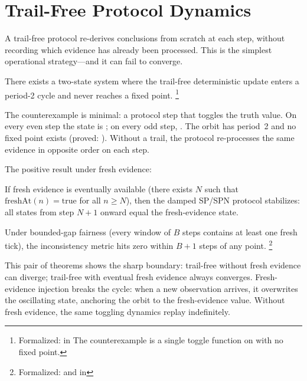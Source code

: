 \documentclass[11pt,openany]{report}
\begin{document}
\section{Trail-Free Protocol Dynamics}
\label{sec:trail-free}

A trail-free protocol re-derives conclusions from scratch at each
step, without recording which evidence has already been processed.
This is the simplest operational strategy---and it can fail to
converge.

\begin{theorem}
\label{thm:trail-free-no-go}
There exists a two-state system where the trail-free deterministic
update enters a period-2 cycle and never reaches a fixed point.%
\footnote{Formalized:
in 
  The counterexample is a single toggle function on
 with no fixed point.}
\end{theorem}

\noindent
The counterexample is minimal: a protocol step that toggles the
truth value.  On every even step the state is ; on every
odd step, .  The orbit has period~2 and no fixed point
exists (proved: ).  Without a trail, the
protocol re-processes the same evidence in opposite order on each
step.

The positive result under fresh evidence:

\begin{theorem}
\label{thm:damped-convergence}
If fresh evidence is eventually available (there exists $N$ such
that $\mathrm{freshAt}(n) = \mathrm{true}$ for all $n \ge N$),
then the damped SP/SPN protocol stabilizes: all states from step
$N+1$ onward equal the fresh-evidence state.

Under bounded-gap fairness (every window of $B$ steps contains at
least one fresh tick), the inconsistency metric hits zero within
$B + 1$ steps of any point.%
\footnote{Formalized:
and 
in 
}
\end{theorem}

\noindent
This pair of theorems shows the sharp boundary: trail-free without
fresh evidence can diverge; trail-free with eventual fresh evidence
always converges.  Fresh-evidence injection breaks the cycle: when
a new observation arrives, it overwrites the oscillating state,
anchoring the orbit to the fresh-evidence value.  Without fresh
evidence, the same toggling dynamics replay indefinitely.
\end{document}

